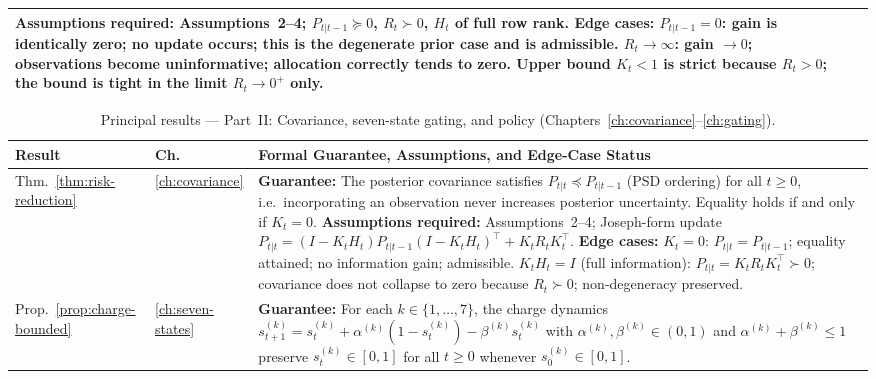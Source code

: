 \documentclass[12pt,openany]{book}
\numberwithin{equation}{chapter}
\theoremstyle{plain}
\theoremstyle{definition}
\theoremstyle{remark}
\begin{document}
\begin{table}[H]
\begin{tabularx}{\linewidth}{@{} l l X @{}}
    \newline
    \textbf{Assumptions required:} Assumptions~2--4;
    $P_{t|t-1} \succeq 0$, $R_t \succ 0$,
    $H_t$ of full row rank.
    \newline
    \textbf{Edge cases:} $P_{t|t-1} = 0$: gain is identically zero;
    no update occurs; this is the degenerate prior case and is
    admissible.  $R_t \to \infty$: gain $\to 0$; observations become
    uninformative; allocation correctly tends to zero.  Upper bound
    $K_t < 1$ is strict because $R_t > 0$; the bound is tight in
    the limit $R_t \to 0^+$ only. \\
\bottomrule
\end{tabularx}
\end{table}

\begin{table}[H]
\centering
\caption{Principal results --- Part~II: Covariance, seven-state
         gating, and policy
         (Chapters~\ref{ch:covariance}--\ref{ch:gating}).}
\label{tab:summary-b}
\small
\begin{tabularx}{\linewidth}{@{} l l X @{}}
\toprule
\textbf{Result} & \textbf{Ch.} & \textbf{Formal Guarantee,
  Assumptions, and Edge-Case Status} \\
\midrule
Thm.~\ref{thm:risk-reduction}
  & \ref{ch:covariance}
  & \textbf{Guarantee:} The posterior covariance satisfies
    $P_{t|t} \preceq P_{t|t-1}$ (PSD ordering) for all $t \ge 0$,
    i.e.\ incorporating an observation never increases posterior
    uncertainty.  Equality holds if and only if $K_t = 0$.
    \newline
    \textbf{Assumptions required:} Assumptions~2--4;
    Joseph-form update
    $P_{t|t} = (I - K_t H_t)P_{t|t-1}(I-K_t H_t)^\top
               + K_t R_t K_t^\top$.
    \newline
    \textbf{Edge cases:} $K_t = 0$: $P_{t|t} = P_{t|t-1}$;
    equality attained; no information gain; admissible.
    $K_t H_t = I$ (full information): $P_{t|t} = K_t R_t K_t^\top
    \succ 0$; covariance does not collapse to zero because
    $R_t \succ 0$; non-degeneracy preserved. \\
\midrule
Prop.~\ref{prop:charge-bounded}
  & \ref{ch:seven-states}
  & \textbf{Guarantee:} For each $k \in \{1,\ldots,7\}$, the
    charge dynamics
    $s^{(k)}_{t+1} = s^{(k)}_t + \alpha^{(k)}(1 - s^{(k)}_t) - \beta^{(k)} s^{(k)}_t$
    with $\alpha^{(k)},\beta^{(k)} \in (0,1)$ and
    $\alpha^{(k)} + \beta^{(k)} \le 1$ preserve
    $s^{(k)}_t \in [0,1]$ for all $t \ge 0$
    whenever $s^{(k)}_0 \in [0,1]$.

\end{tabularx}
\end{table}
\end{document}
